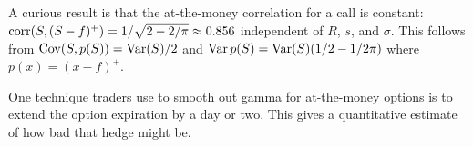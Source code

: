 \documentclass[fleqn]{amsart}
\newcommand{\Var}{\mathop{\rm{Var}}}
\newcommand{\Cov}{\mathop{\rm{Cov}}}
\newcommand{\corr}{\mathop{\rm{corr}}}
\begin{document}
A curious result is that the at-the-money correlation for a call
is constant:
\(\corr(S,(S - f)^+) = 1/\sqrt{2 - 2/\pi} \approx 0.856\)
independent of \(R\), \(s\), and \(\sigma\).
This follows from \(\Cov(S,p(S)) = \Var(S)/2\) and
\(\Var p(S) = \Var(S)(1/2 - 1/2\pi)\) where \(p(x) = (x - f)^+\).

One technique
traders use to smooth out gamma for at-the-money options is to extend 
the option expiration by a day or two. This gives a quantitative estimate
of how bad that hedge might be.

%
%
\end{document}
